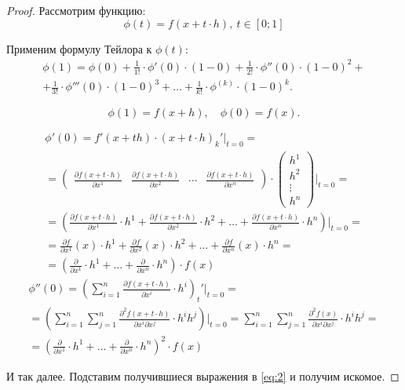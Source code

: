 \begin{proof}
    Рассмотрим функцию:
    \[
        \phi(t) = f(x + t\cdot h), \ t \in [0;1]
    \]

    Применим формулу Тейлора к $\phi(t)$:
    \begin{multline}\label{eq:2}
        \phi(1) = \phi(0) + \frac{1}{1!} \cdot \phi'(0) \cdot (1-0) + \frac{1}{2!} \cdot \phi''(0) \cdot (1-0)^2 + \\
        + \frac{1}{3!} \cdot \phi'''(0) \cdot (1-0)^3 + \ldots + \frac{1}{k!} \cdot \phi^{(k)} \cdot (1-0)^k.
    \end{multline}

    \[
        \phi(1) = f(x + h), \quad \phi(0) = f(x).
    \]

    \begin{multline*}
        \phi'(0) = f'(x + th) \cdot (x + t\cdot h)_k'\Big|_{t = 0} = \\
        = \left(\begin{matrix}
                \frac{\partial f(x + t\cdot h)}{\partial x^1} & \frac{\partial f(x + t\cdot h)}{\partial x^2} & \cdots & \frac{\partial f(x + t\cdot h)}{\partial x^n}
            \end{matrix}\right) \cdot \left(\begin{matrix}
                h^1 \\ h^2 \\ \vdots \\ h^n
            \end{matrix}\right)\Bigg|_{t=0} = \\
        = \left(\frac{\partial f(x + t\cdot h)}{\partial x^1} \cdot h^1 + \frac{\partial f(x+t\cdot h)}{\partial x^2} \cdot h^2 + \ldots + \frac{\partial f(x + t\cdot h)}{\partial x^n}\cdot h^n\right) \Bigg|_{t=0} = \\
        = \frac{\partial f}{\partial x^1}(x)\cdot h^1 + \frac{\partial f}{\partial x^2}(x)\cdot h^2 + \ldots + \frac{\partial f}{\partial x^n}(x) \cdot h^n = \\
        = \left(\frac{\partial}{\partial x^1} \cdot h^1 + \ldots + \frac{\partial}{\partial x^n}\cdot h^n\right)\cdot f(x)
    \end{multline*}
    \begin{multline*}
        \phi''(0) = \left(\sum_{i = 1}^{n} \frac{\partial f(x + t\cdot h)}{\partial x^i}\cdot h^i\right)_t' \Bigg|_{t = 0} = \\
        = \left(\sum_{i = 1}^{n} \sum_{j = 1}^{n} \frac{\partial^2 f(x + t\cdot h)}{\partial x^i \partial x^j}\cdot h^i h^j\right) \Bigg|_{t = 0} = \sum_{i = 1}^{n}\sum_{j = 1}^{n}\frac{\partial^2 f(x)}{\partial x^i \partial x^j}\cdot h^i h^j = \\
        = \left(\frac{\partial}{\partial x^1}\cdot h^1 + \ldots + \frac{\partial}{\partial x^n}\cdot h^n\right)^2 \cdot f(x)
    \end{multline*}

    И так далее. Подставим получившиеся выражения в \ref{eq:2} и получим искомое.
\end{proof}

